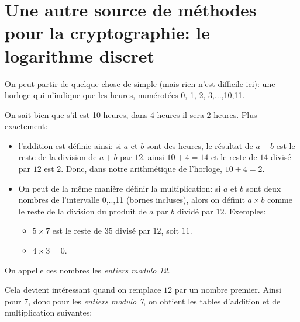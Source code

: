 
\section{Une autre \og source\fg{} de méthodes pour la cryptographie:
  le logarithme discret}

On peut partir de quelque chose de simple (mais rien n'est difficile
ici): une horloge qui n'indique que les heures, numérotées 0, 1, 2,
3,...,10,11.

On sait bien que s'il est 10 heures, dans 4 heures il sera 2
heures. Plus exactement:
\begin{itemize}
  \item l'addition est définie ainsi: si $a$ et $b$ sont des \og
    heures\fg, le résultat de $a+b$ est le reste de la division de
    $a+b$ par $12$. ainsi $10 + 4 = 14$ et le reste de $14$ divisé par
    $12$ est $2$. Donc, dans notre arithmétique de l'horloge, $10+4 =
    2$.
  \item On peut de la même manière définir la multiplication: si $a$
    et $b$ sont deux nombres de l'intervalle 0,..,11 (bornes
    incluses), alors on définit $a \times b$ comme le reste de la
    division du produit de $a$ par $b$ dividé par $12$. Exemples:
    \begin{itemize}
      \item $5 \times 7$ est le reste de $35$ divisé par $12$, soit
        $11$.
      \item $4 \times 3 =0$.
    \end{itemize}
\end{itemize}

On appelle ces nombres les \emph{entiers modulo 12}.

Cela devient intéressant quand on remplace $12$ par un nombre
premier. Ainsi pour $7$, donc  pour les \emph{entiers modulo 7},  on obtient
les tables d'addition et de multiplication suivantes:


